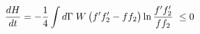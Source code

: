 \documentclass[preview]{standalone}
\begin{document}
\begin{align*}
\special{dvisvgm:raw <g id='unique000'>}\dv{H}{t}=-\frac14\int d\Gamma\;W\,\big(f'f_2'-ff_2\big)\ln\frac{f'f_2'}{ff_2}\ \le 0\special{dvisvgm:raw </g>}
\end{align*}
\end{document}
